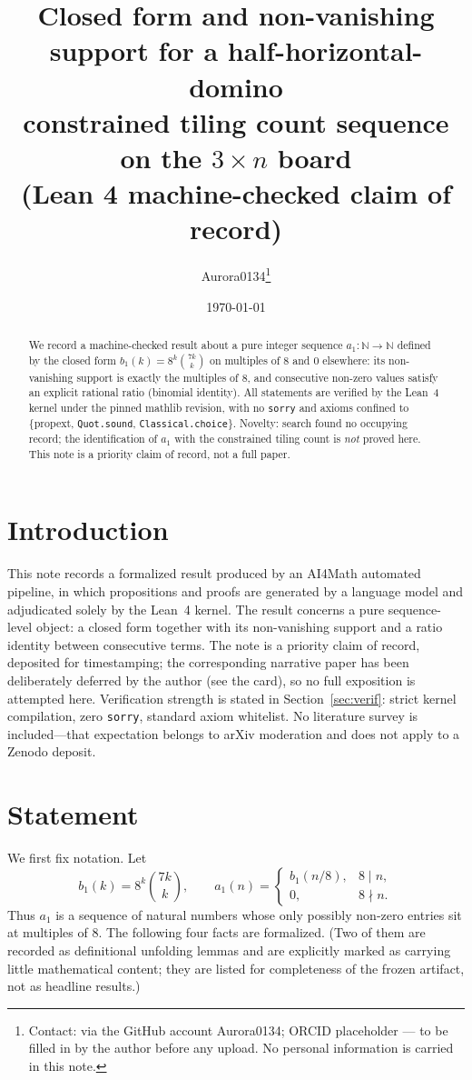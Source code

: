 \documentclass[11pt]{article}
\title{Closed form and non-vanishing support for a half-horizontal-domino\\
constrained tiling count sequence on the $3\times n$ board\\
{\large (Lean 4 machine-checked claim of record)}}
\author{Aurora0134\thanks{Contact: via the GitHub account Aurora0134; ORCID
placeholder --- to be filled in by the author before any upload. No personal
information is carried in this note.}}
\date{\today}
\begin{document}
\maketitle

\begin{abstract}
We record a machine-checked result about a pure integer sequence
$a_1\colon\mathbb{N}\to\mathbb{N}$ defined by the closed form
$b_1(k)=8^k\binom{7k}{k}$ on multiples of $8$ and $0$ elsewhere: its non-vanishing
support is exactly the multiples of $8$, and consecutive non-zero values satisfy an
explicit rational ratio (binomial identity). All statements are verified by the Lean~4
kernel under the pinned mathlib revision, with no \texttt{sorry} and axioms confined to
\{propext, \texttt{Quot.sound}, \texttt{Classical.choice}\}. Novelty: search found no
occupying record; the identification of $a_1$ with the constrained tiling count is
\emph{not} proved here. This note is a priority claim of record, not a full paper.
\end{abstract}

\section{Introduction}
This note records a formalized result produced by an AI4Math automated pipeline, in which
propositions and proofs are generated by a language model and adjudicated solely by the
Lean~4 kernel. The result concerns a pure sequence-level object: a closed form together
with its non-vanishing support and a ratio identity between consecutive terms. The note is
a priority claim of record, deposited for timestamping; the corresponding narrative paper
has been deliberately deferred by the author (see the card), so no full exposition is
attempted here. Verification strength is stated in Section~\ref{sec:verif}: strict kernel
compilation, zero \texttt{sorry}, standard axiom whitelist. No literature survey is
included---that expectation belongs to arXiv moderation and does not apply to a Zenodo
deposit.

\section{Statement}

We first fix notation. Let
\[
b_1(k) = 8^k \binom{7k}{k}, \qquad
a_1(n) = \begin{cases} b_1(n/8), & 8 \mid n,\\ 0, & 8 \nmid n. \end{cases}
\]
Thus $a_1$ is a sequence of natural numbers whose only possibly non-zero entries sit at
multiples of $8$. The following four facts are formalized. (Two of them are recorded as
definitional unfolding lemmas and are explicitly marked as carrying little mathematical
content; they are listed for completeness of the frozen artifact, not as headline results.)
\end{document}
